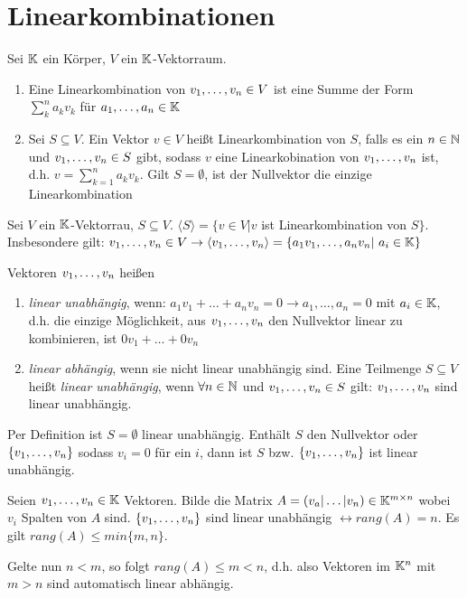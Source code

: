 \section{Linearkombinationen}
\begin{definition}[Linearkombination]
	Sei $\mathbb{K}$ ein Körper, $V$ ein $\mathbb{K}$-Vektorraum.
	\begin{enumerate}[noitemsep]
		\item Eine Linearkombination von $v_1, \dots, v_n \in V$ ist eine Summe der Form $\sum_{k}^{n}a_kv_k$ für $a_1, \dots, a_n \in \mathbb{K}$
		\item Sei $S \subseteq V$. Ein Vektor $v \in V$ heißt Linearkombination von $S$, falls es ein $n \in \mathbb{N}$ und $v_1, \dots, v_n \in S$ gibt, sodass $v$ eine Linearkobination von $v_1, \dots, v_n$ ist, d.h. $v = \sum_{k=1}^{n} a_kv_k$. Gilt $S = \emptyset$,  ist der Nullvektor die einzige Linearkombination
	\end{enumerate}
\end{definition}

\begin{definition}
	Sei $V$ ein $\mathbb{K}$-Vektorrau, $S \subseteq V$. $\langle S \rangle = \{v \in V | v$ ist Linearkombination von $ S \}$. Insbesondere gilt: $\suboneton{v} \in V \rightarrow \langle \suboneton{v} \rangle = \{a_1v_1, \dots, a_nv_n | \ a_i \in \fieldk\}$
\end{definition}

\begin{definition}
	Vektoren $v_1, \dots, v_n$ heißen
	\begin{enumerate}[noitemsep]
		\item \emph{linear unabhängig}, wenn: $a_1v_1 + \dots + a_nv_n = 0 \rightarrow a_1,\dots, a_n = 0$ mit $a_i \in \mathbb{K}$, d.h. die einzige Möglichkeit, aus $v_1, \dots, v_n$ den Nullvektor linear zu kombinieren, ist $0v_1 + \dots + 0v_n$
		\item \emph{linear abhängig}, wenn sie nicht linear unabhängig sind. Eine Teilmenge $S \subseteq V$ heißt \emph{linear unabhängig}, wenn $\forall n \in \mathbb{N}$ und $v_1, \dots, v_n \in S$ gilt: $v_1, \dots, v_n$ sind linear unabhängig.
	\end{enumerate}
Per Definition ist $S = \emptyset$ linear unabhängig. Enthält $S$ den Nullvektor oder $\{v_1, \dots, v_n\}$ sodass $v_i = 0$ für ein $i$, dann ist $S$ bzw. $\{ v_1, \dots, v_n \}$ ist linear unabhängig.
\end{definition}

\begin{satz}
	Seien $v_1, \dots, v_n \in \mathbb{K}$ Vektoren. Bilde die Matrix $A = (v_a|\dots|v_n) \in \mathbb{K}^{m \times n}$ wobei $v_i$ Spalten von $A$ sind. $\{v_1, \dots, v_n\}$ sind linear unabhängig $\leftrightarrow rang(A) = n$. Es gilt $rang(A) \leq min\{m,n\}$. 
	
	Gelte nun $n < m$, so folgt $rang(A) \leq m < n$, d.h. also Vektoren im $\mathbb{K}^n$ mit $m > n$ sind automatisch linear abhängig.
\end{satz}
\pagebreak

